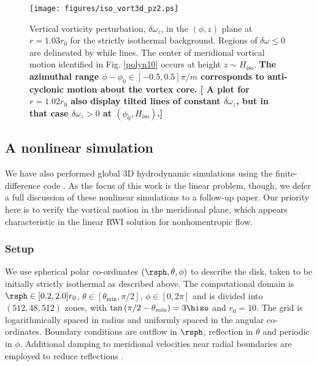   

\begin{figure}[!t]
  \centering
  \texttt{[image: figures/iso\_vort3d\_pz2.ps]}
  \caption{
      Vertical vorticity perturbation, $\delta\omega_z$, in the
      $(\phi,z)$ plane at $r=1.03r_0$ for the strictly isothermal
      background. Regions of $\delta\omega\leq0$ are delineated by
      while lines. The center of meridional vortical motion identified
      in Fig. \ref{polyn10} occurs at height $z\sim
      H_\mathrm{iso}$. {\bf The azimuthal range
        $\phi-\phi_0\in[-0.5,0.5]\pi/m$ corresponds to anti-cyclonic
        motion about the vortex core.
        [ A plot for $r=1.02r_0$ also display
      tilted lines of constant $\delta\omega_z$, but in that case $\delta\omega_z > 0$
      at $(\phi_0, H_\mathrm{iso})$.]
      } 
    \label{iso_vort3d_pz}}
\end{figure}

\subsection{A nonlinear simulation}
We have also performed global 3D hydrodynamic simulations
using the \zeus  finite-difference code \citep{hays06}. As the focus
of this work is the linear problem, though, we defer a full discussion
of these nonlinear simulations to a follow-up paper. Our priority here
is to verify the  vortical motion in the meridional plane, which
appears characteristic in  the linear RWI solution for  nonhomentropic
flow.   

\subsubsection{Setup}
We use spherical polar co-ordinates $(\rsph,\theta,\phi)$ to describe
the disk, taken to be initially strictly isothermal as described above.  The
computational domain is $\rsph\in[0.2,2.0]r_0$,
$\theta\in[\theta_\mathrm{min},\pi/2]$, $\phi\in[0,2\pi]$ and is
divided into $(512,48,512)$ zones, with
$\tan{(\pi/2-\theta_\mathrm{min})}=3\hiso$ and $r_0=10$. 
The grid is logarithmically spaced in radius and uniformly spaced in 
the angular co-ordinates. Boundary conditions 
are outflow in $\rsph$, reflection in $\theta$ and periodic in $\phi$.  
Additional damping to meridional velocities near radial boundaries are
employed to reduce reflections \citep{valborro07}.  

